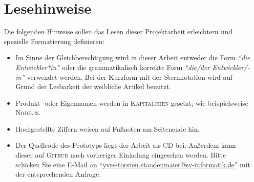\chapter*{Lesehinweise}
Die folgenden Hinweise sollen das Lesen dieser Projektarbeit erleichtern und spezielle Formatierung definieren:

\begin{itemize}
	\item Im Sinne der Gleichberechtigung wird in dieser Arbeit entweder die Form \textit{\enquote{die Entwickler*in}} oder die grammatikalisch korrekte Form \textit{\enquote{die/der Entwickler/-in}} verwendet werden. Bei der Kurzform mit der Sternnotation wird auf Grund der Lesbarkeit der weibliche Artikel benutzt.
	\item Produkt- oder Eigennamen werden in \textsc{Kapitälchen} gesetzt, wie beispielsweise \textsc{Node.js}.
	\item Hochgestellte Ziffern weisen auf Fußnoten am Seitenende hin.
	\item Der Quellcode des Prototyps liegt der Arbeit als CD bei. Außerdem kann dieser auf \textsc{Github} nach vorheriger Einladung eingesehen werden. Bitte schicken Sie eine E-Mail an \enquote{\href{mailto:yves-torsten.staudenmaier@sv-informatik.de}{yves-torsten.staudenmaier@sv-informatik.de}} mit der entsprechenden Anfrage. 
\end{itemize}
 